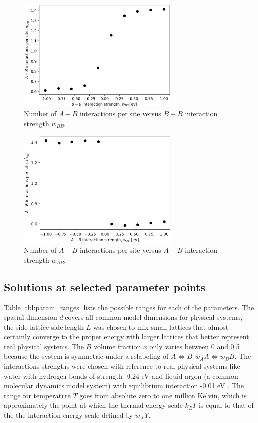 \documentclass[10pt]{article}
\begin{document}
\begin{figure}[h!]
\centering
\includegraphics[width=0.70\textwidth]{Figures/m_AB_hat_versus_w_BB.png}
\caption{Number of $A-B$ interactions per site versus $B-B$ interaction strength $w_{BB}$.}
\label{fig:m_AB_hat_versus_w_BB}
\end{figure}

\begin{figure}[h!]
\centering
\includegraphics[width=0.70\textwidth]{Figures/m_AB_hat_versus_w_AB.png}
\caption{Number of $A-B$ interactions per site versus $A-B$ interaction strength $w_{AB}$.}
\label{fig:m_AB_hat_versus_w_AB}
\end{figure}

\subsection{Solutions at selected parameter points}
Table \ref{tbl:param_ranges} lists the possible ranges for each of the parameters.
The spatial dimension $d$ covers all common model dimensions for physical systems, the side lattice side length $L$ was chosen to mix small lattices that almost certainly converge to the proper energy with larger lattices that better represent real physical systems.
The $B$ volume fraction $x$ only varies between 0 and 0.5 because the system is symmetric under a relabeling of $A \iff B, w_AA \iff w_BB$.
The interactions strengths were chosen with reference to real physical systems like water with hydrogen bonds of strength -0.24 eV and liquid argon (a common molecular dynamics model system) with equilibrium interaction -0.01 eV \cite{water} \cite{argon}.
The range for temperature $T$ goes from absolute zero to one million Kelvin, which is approximately the point at which the thermal energy scale $k_B T$ is equal to that of the the interaction energy scale defined by $w_XY$.
\end{document}
